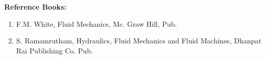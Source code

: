 \documentclass[12pt, a4paper]{article}
\begin{document}
                                                                                                                                                                                                                                                                                                                                                                                                                    \noindent \textbf{Reference Books:}
                                                                                                                                                                                                                                                                                                                                                                                                                    \begin{enumerate}[label=\arabic*., leftmargin=*]
                                                                                                                                                                                                                                                                                                                                                                                                                        \item F.M. White, Fluid Mechanics, Mc. Graw Hill, Pub.
                                                                                                                                                                                                                                                                                                                                                                                                                            \item S. Ramamrutham, Hydraulics, Fluid Mechanics and Fluid Machines, Dhanpat Rai Publishing Co. Pub.
                                                                                                                                                                                                                                                                                                                                                                                                                            \end{enumerate}

                                                                                                                                                                                                                                                                                                                                                                                                                            \newpage
\end{document}
